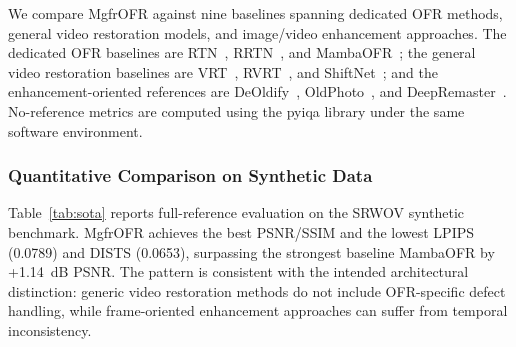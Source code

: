 We compare MgfrOFR against nine baselines spanning dedicated OFR methods, general video restoration models, and image/video enhancement approaches. The dedicated OFR baselines are RTN~\cite{wan2022rtn}, RRTN~\cite{lin2024rrtn}, and MambaOFR~\cite{mao2025mambaofr}; the general video restoration baselines are VRT~\cite{liang2024vrt}, RVRT~\cite{liang2022rvrt}, and ShiftNet~\cite{li2023shiftnet}; and the enhancement-oriented references are DeOldify~\cite{jantic2019deoldify}, OldPhoto~\cite{wan2023oldphotopami}, and DeepRemaster~\cite{iizuka2019deepremaster}. No-reference metrics are computed using the pyiqa library under the same software environment.

\subsubsection{Quantitative Comparison on Synthetic Data}

Table~\ref{tab:sota} reports full-reference evaluation on the SRWOV synthetic benchmark. MgfrOFR achieves the best PSNR/SSIM and the lowest LPIPS (0.0789) and DISTS (0.0653), surpassing the strongest baseline MambaOFR by +1.14~dB PSNR. The pattern is consistent with the intended architectural distinction: generic video restoration methods do not include OFR-specific defect handling, while frame-oriented enhancement approaches can suffer from temporal inconsistency.

